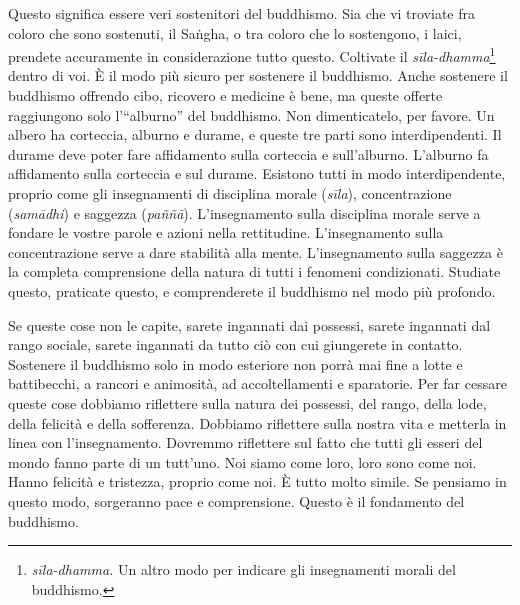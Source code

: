 Questo significa essere veri sostenitori del buddhismo. Sia che vi
troviate fra coloro che sono sostenuti, il Saṅgha, o tra coloro che lo
sostengono, i laici, prendete accuramente in considerazione tutto
questo. Coltivate il \emph{sīla-dhamma}\footnote{\emph{sīla-dhamma.} Un
  altro modo per indicare gli insegnamenti morali del buddhismo.} dentro
di voi. È il modo più sicuro per sostenere il buddhismo. Anche sostenere
il buddhismo offrendo cibo, ricovero e medicine è bene, ma queste
offerte raggiungono solo l'``alburno'' del buddhismo. Non dimenticatelo,
per favore. Un albero ha corteccia, alburno e durame, e queste tre parti
sono interdipendenti. Il durame deve poter fare affidamento sulla
corteccia e sull'alburno. L'alburno fa affidamento sulla corteccia e sul
durame. Esistono tutti in modo interdipendente, proprio come gli
insegnamenti di disciplina morale (\emph{sīla}), concentrazione
(\emph{samādhi}) e saggezza (\emph{paññā}). L'insegnamento sulla
disciplina morale serve a fondare le vostre parole e azioni nella
rettitudine. L'insegnamento sulla concentrazione serve a dare stabilità
alla mente. L'insegnamento sulla saggezza è la completa comprensione
della natura di tutti i fenomeni condizionati. Studiate questo,
praticate questo, e comprenderete il buddhismo nel modo più profondo.

Se queste cose non le capite, sarete ingannati dai possessi, sarete
ingannati dal rango sociale, sarete ingannati da tutto ciò con cui
giungerete in contatto. Sostenere il buddhismo solo in modo esteriore
non porrà mai fine a lotte e battibecchi, a rancori e animosità, ad
accoltellamenti e sparatorie. Per far cessare queste cose dobbiamo
riflettere sulla natura dei possessi, del rango, della lode, della
felicità e della sofferenza. Dobbiamo riflettere sulla nostra vita e
metterla in linea con l'insegnamento. Dovremmo riflettere sul fatto che
tutti gli esseri del mondo fanno parte di un tutt'uno. Noi siamo come
loro, loro sono come noi. Hanno felicità e tristezza, proprio come noi.
È tutto molto simile. Se pensiamo in questo modo, sorgeranno pace e
comprensione. Questo è il fondamento del buddhismo.

